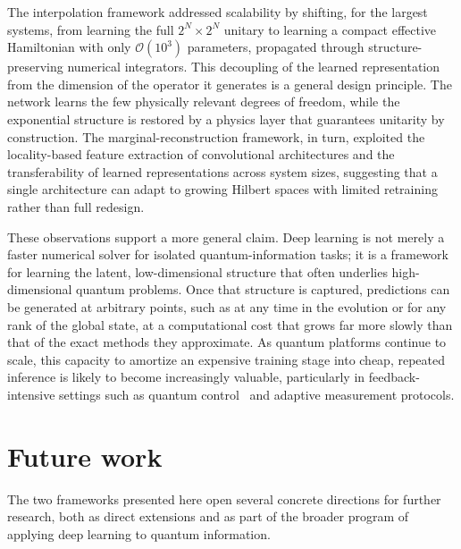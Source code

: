 The interpolation framework addressed scalability by shifting, for the largest systems, from learning the full $2^N \times 2^N$ unitary to learning a compact effective Hamiltonian with only $\mathcal{O}(10^3)$ parameters, propagated through structure-preserving numerical integrators. This decoupling of the learned representation from the dimension of the operator it generates is a general design principle. The network learns the few physically relevant degrees of freedom, while the exponential structure is restored by a physics layer that guarantees unitarity by construction. The marginal-reconstruction framework, in turn, exploited the locality-based feature extraction of convolutional architectures and the transferability of learned representations across system sizes, suggesting that a single architecture can adapt to growing Hilbert spaces with limited retraining rather than full redesign.

These observations support a more general claim. Deep learning is not merely a faster numerical solver for isolated quantum-information tasks; it is a framework for learning the latent, low-dimensional structure that often underlies high-dimensional quantum problems. Once that structure is captured, predictions can be generated at arbitrary points, such as at any time in the evolution or for any rank of the global state, at a computational cost that grows far more slowly than that of the exact methods they approximate. As quantum platforms continue to scale, this capacity to amortize an expensive training stage into cheap, repeated inference is likely to become increasingly valuable, particularly in feedback-intensive settings such as quantum control~\cite{norambuena2024, Ansel_2024, Dalgaard_2022} and adaptive measurement protocols.

\section{Future work}
\label{sec:conc-future}

The two frameworks presented here open several concrete directions for further research, both as direct extensions and as part of the broader program of applying deep learning to quantum information.

